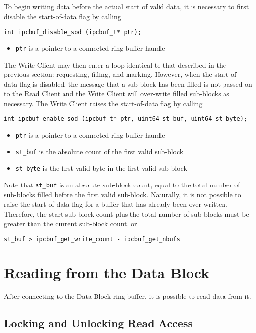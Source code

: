 To begin writing data before the actual start of valid data, it is
necessary to first disable the start-of-data flag by calling
\begin{verbatim}
int ipcbuf_disable_sod (ipcbuf_t* ptr);
\end{verbatim}
\vspace{-3mm}
\begin{itemize}
\item {\tt ptr} is a pointer to a connected ring buffer handle
\end{itemize}
The Write Client may then enter a loop identical to that described in
the previous section: requesting, filling, and marking.  However, when
the start-of-data flag is disabled, the message that a sub-block has
been filled is not passed on to the Read Client and the Write Client
will over-write filled sub-blocks as necessary.  The Write Client
raises the start-of-data flag by calling
\begin{verbatim}
int ipcbuf_enable_sod (ipcbuf_t* ptr, uint64 st_buf, uint64 st_byte);
\end{verbatim}
\vspace{-3mm}
\begin{itemize}
\item {\tt ptr} is a pointer to a connected ring buffer handle
\item {\tt st\_buf} is the absolute count of the first valid sub-block
\item {\tt st\_byte} is the first valid byte in the first valid sub-block
\end{itemize}

Note that {\tt st\_buf} is an absolute sub-block count, equal to the
total number of sub-blocks filled before the first valid sub-block.
Naturally, it is not possible to raise the start-of-data flag for a
buffer that has already been over-written.  Therefore, the start
sub-block count plus the total number of sub-blocks must be greater
than the current sub-block count, or
\begin{verbatim}
st_buf > ipcbuf_get_write_count - ipcbuf_get_nbufs
\end{verbatim}


\section{Reading from the Data Block}

After connecting to the Data Block ring buffer, it is possible to read
data from it.  

\subsection{Locking and Unlocking Read Access}

